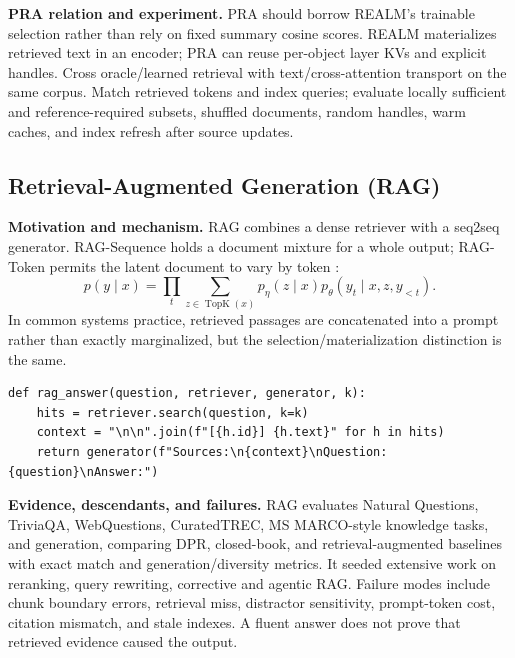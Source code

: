 \textbf{PRA relation and experiment.} PRA should borrow REALM's trainable selection rather
than rely on fixed summary cosine scores.  REALM materializes retrieved text in an encoder;
PRA can reuse per-object layer KVs and explicit handles.  Cross oracle/learned retrieval
with text/cross-attention transport on the same corpus.  Match retrieved tokens and index
queries; evaluate locally sufficient and reference-required subsets, shuffled documents,
random handles, warm caches, and index refresh after source updates.

\subsection{Retrieval-Augmented Generation (RAG)}

\textbf{Motivation and mechanism.} RAG combines a dense retriever with a seq2seq generator.
RAG-Sequence holds a document mixture for a whole output; RAG-Token permits the latent
document to vary by token \citep{lewis2020rag}:
\begin{equation}
p(y\mid x)=\prod_t\sum_{z\in\operatorname{TopK}(x)}
p_\eta(z\mid x)p_\theta(y_t\mid x,z,y_{<t}).
\end{equation}
In common systems practice, retrieved passages are concatenated into a prompt rather than
exactly marginalized, but the selection/materialization distinction is the same.

\begin{lstlisting}[caption={Minimal retrieve-then-read RAG pipeline}]
def rag_answer(question, retriever, generator, k):
    hits = retriever.search(question, k=k)
    context = "\n\n".join(f"[{h.id}] {h.text}" for h in hits)
    return generator(f"Sources:\n{context}\nQuestion: {question}\nAnswer:")
\end{lstlisting}

\textbf{Evidence, descendants, and failures.} RAG evaluates Natural Questions, TriviaQA,
WebQuestions, CuratedTREC, MS MARCO-style knowledge tasks, and generation, comparing DPR,
closed-book, and retrieval-augmented baselines with exact match and generation/diversity
metrics.  It seeded extensive work on reranking, query rewriting, corrective and agentic
RAG.  Failure modes include chunk boundary errors, retrieval miss, distractor sensitivity,
prompt-token cost, citation mismatch, and stale indexes.  A fluent answer does not prove
that retrieved evidence caused the output.

